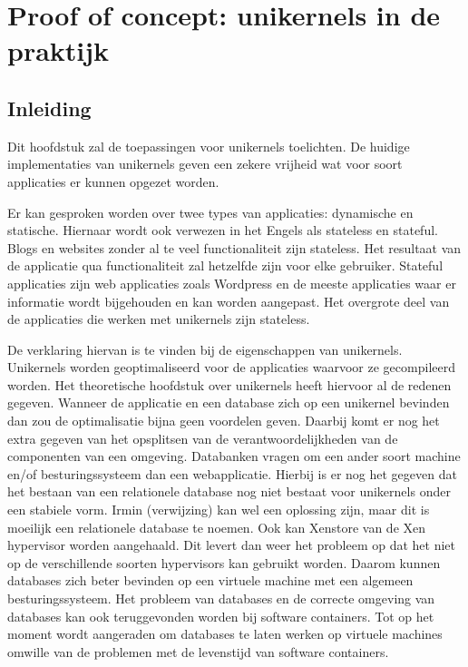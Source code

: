 \chapter{Proof of concept: unikernels in de praktijk}
\label{ch:proof-of-concept}
\section{Inleiding}

Dit hoofdstuk zal de toepassingen voor unikernels toelichten. De huidige implementaties van unikernels geven een zekere vrijheid wat voor soort applicaties er kunnen opgezet worden.  

Er kan gesproken worden over twee types van applicaties: dynamische en statische. Hiernaar wordt ook verwezen in het Engels als stateless en stateful. Blogs en websites zonder al te veel functionaliteit zijn stateless. Het resultaat van de applicatie qua functionaliteit zal hetzelfde zijn voor elke gebruiker. Stateful applicaties zijn web applicaties zoals Wordpress en de meeste applicaties waar er informatie wordt bijgehouden en kan worden aangepast. Het overgrote deel van de applicaties die werken met unikernels zijn stateless.

De verklaring hiervan is te vinden bij de eigenschappen van unikernels. Unikernels worden geoptimaliseerd voor de applicaties waarvoor ze gecompileerd worden. Het theoretische hoofdstuk over unikernels heeft hiervoor al de redenen gegeven. Wanneer de applicatie en een database zich op een unikernel bevinden dan zou de optimalisatie bijna geen voordelen geven. Daarbij komt er nog het extra gegeven van het opsplitsen van de verantwoordelijkheden van de componenten van een omgeving. Databanken vragen om een ander soort machine en/of besturingssysteem dan een webapplicatie. Hierbij is er nog het gegeven dat het bestaan van een relationele database nog niet bestaat voor unikernels onder een stabiele vorm. Irmin (verwijzing) kan wel een oplossing zijn, maar dit is moeilijk een relationele database te noemen. Ook kan Xenstore van de Xen hypervisor worden aangehaald. Dit levert dan weer het probleem op dat het niet op de verschillende soorten hypervisors kan gebruikt worden. Daarom kunnen databases zich beter bevinden op een virtuele machine met een algemeen besturingssysteem. Het probleem van databases en de correcte omgeving van databases kan ook teruggevonden worden bij software containers. Tot op het moment wordt aangeraden om databases te laten werken op virtuele machines omwille van de problemen met de levenstijd van software containers.

